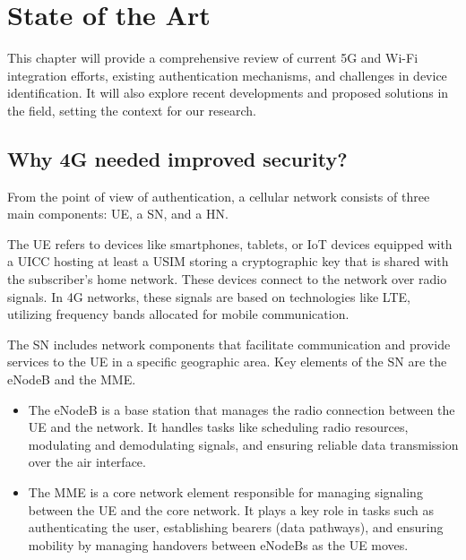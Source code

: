 \chapter{State of the Art}
\label{chapter:State of the Art}

\begin{introduction}
This chapter will provide a comprehensive review of current \ac{5G} and Wi-Fi integration efforts, existing authentication mechanisms, and challenges in device identification. It will also explore recent developments and proposed solutions in the field, setting the context for our research.
\end{introduction}

\section{Why \ac{4G} needed improved security?}

From the point of view of authentication, a cellular network consists of three main components: \ac{UE}, a \ac{SN}, and a \ac{HN}.

The \ac{UE} refers to devices like smartphones, tablets, or IoT devices equipped with a \ac{UICC}  hosting at least a \ac{USIM} storing a cryptographic key that is shared with the subscriber’s home network. These devices connect to the network over radio signals. In \ac{4G} networks, these signals are based on technologies like \ac{LTE}, utilizing frequency bands allocated for mobile communication.

The \ac{SN} includes network components that facilitate communication and provide services to the \ac{UE} in a specific geographic area. Key elements of the \ac{SN} are the \ac{eNodeB} and the \ac{MME}.

\begin{itemize}
    \item{
        The \ac{eNodeB} is a base station that manages the radio connection between the \ac{UE} and the network. It handles tasks like scheduling radio resources, modulating and demodulating signals, and ensuring reliable data transmission over the air interface.
    }
    \item {
        The \ac{MME} is a core network element responsible for managing signaling between the \ac{UE} and the core network. It plays a key role in tasks such as authenticating the user, establishing bearers (data pathways), and ensuring mobility by managing handovers between \acp{eNodeB} as the \ac{UE} moves.
    }
\end{itemize}


